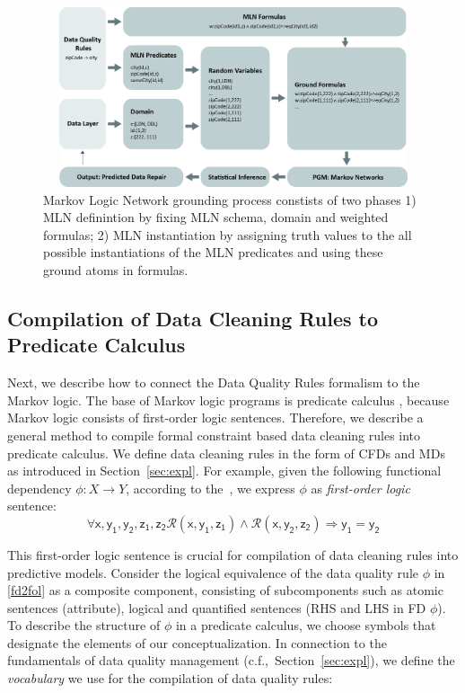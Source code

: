\begin{figure}[t]
 \centering
 \includegraphics[width=450px, height=200px]{img/mlogic-grounging.jpg}
 \caption{ Markov Logic Network grounding process constists of two phases 1) MLN definintion by fixing MLN schema, domain and weighted formulas; 2) MLN instantiation by assigning truth values to the all possible instantiations of the MLN predicates and using these ground atoms in formulas.}
 \label{fig:mlngrounding}
\end{figure}

\subsection{Compilation of Data Cleaning Rules to Predicate Calculus}
\label{sec:ml}

 Next, we describe how to connect the Data Quality Rules formalism to the Markov logic. The base of Markov logic programs is predicate calculus \cite{genesereth1987logical}, because Markov logic consists of first-order logic sentences. Therefore, we describe a general method to compile formal constraint based data cleaning rules into predicate calculus. We define data cleaning rules in the form of CFDs and MDs as introduced in Section~\ref{sec:expl}. For example, given the following functional dependency $\phi: X \rightarrow Y$, according to the~\cite{Fagin:1982:HCD:322344.322347}, we express $\phi$ as \textit{first-order logic} sentence:
\begin{equation}
\mathsf{\forall x, y_1, y_2, z_1, z_2 \mathcal{R}(x, y_1, z_1) \wedge \mathcal{R}(x, y_2, z_2) \Rightarrow y_1=y_2}
\label{fd2fol}
\end{equation}

This first-order logic sentence is crucial for compilation of data cleaning rules into predictive models.  Consider the logical equivalence of the data quality rule $\phi$ in \ref{fd2fol} as a composite component, consisting of subcomponents such as atomic sentences (attribute), logical and quantified sentences (RHS and LHS in FD $\phi$). To describe the structure of $\phi$ in a predicate calculus, we choose symbols that designate the elements of our conceptualization. In connection to the fundamentals of data quality management (c.f.,~Section~\ref{sec:expl}), we define the \textit{vocabulary} we use for the compilation of data quality rules: 

